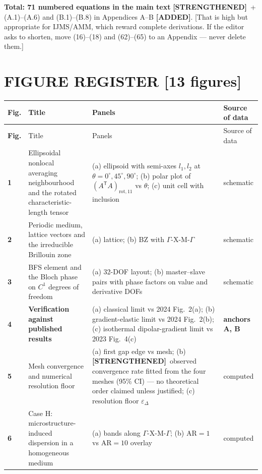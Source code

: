 \documentclass[11pt,a4paper]{article}
\newcommand{\bp}[1]{\textcolor{accent}{\textsf{\footnotesize [#1]}}}
\newcommand{\ADDED}{{\color{addcol}\textbf{[ADDED]}}}
\newcommand{\STR}{{\color{strcol}\textbf{[STRENGTHENED]}}}
\begin{document}
\textbf{Total: 71 numbered equations in the main text} \STR\ + (A.1)--(A.6) and (B.1)--(B.8) in Appendices A--B \ADDED.
\bp{That is high but appropriate for IJMS/AMM, which reward complete derivations. If the editor asks to shorten, move (16)--(18) and (62)--(65) to an Appendix --- never delete them.}

\newpage
\section{FIGURE REGISTER \bp{13 figures}}
\label{sec:figures}

\begin{xltabular}{\textwidth}{@{}>{\bfseries}p{1.05cm} L{4.15cm} Y L{2.15cm}@{}}
\toprule
Fig. & Title & Panels & Source of data \\
\midrule
\endfirsthead
\toprule
Fig. & Title & Panels & Source of data \\
\midrule
{} & Ellipsoidal nonlocal averaging neighbourhood and the rotated characteristic-length tensor & (a) ellipsoid with semi-axes $l_1,l_2$ at $\theta=0^\circ,45^\circ,90^\circ$; (b) polar plot of $(A^{\mathsf T}\!A)_{\mathrm{rot},11}$ vs $\theta$; (c) unit cell with inclusion & schematic \\
2 & Periodic medium, lattice vectors and the irreducible Brillouin zone & (a) lattice; (b) BZ with $\Gamma$-X-M-$\Gamma$ & schematic \\
3 & BFS element and the Bloch phase on $C^1$ degrees of freedom & (a) 32-DOF layout; (b) master--slave pairs with phase factors on value and derivative DOFs & schematic \\
4 & \textbf{Verification against published results} & (a) classical limit vs 2024 Fig.~2(a); (b) gradient-elastic limit vs 2024 Fig.~2(b); (c) isothermal dipolar-gradient limit vs 2023 Fig.~4(c) & \textbf{anchors A, B} \\
5 & Mesh convergence and numerical resolution floor & (a) first gap edge vs mesh; (b) \STR\ observed convergence rate fitted from the four meshes (95\% CI) --- no theoretical order claimed unless justified; (c) resolution floor $\varepsilon_\Delta$ & computed \\
6 & Case H: microstructure-induced dispersion in a homogeneous medium & (a) bands along $\Gamma$-X-M-$\Gamma$; (b) $\mathrm{AR}=1$ vs $\mathrm{AR}=10$ overlay & computed \\

\end{xltabular}
\end{document}
